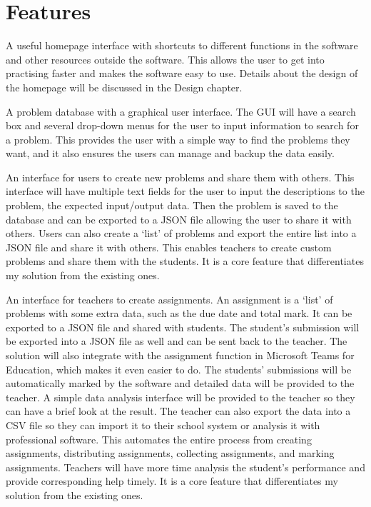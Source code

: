 \documentclass[a4paper]{report}
\begin{document}
\section{Features}

A useful homepage interface with shortcuts to different functions in the software and other resources outside the software. This allows the user to get into practising faster and makes the software easy to use. Details about the design of the homepage will be discussed in the Design chapter.

A problem database with a graphical user interface. The GUI will have a search box and several drop-down menus for the user to input information to search for a problem. This provides the user with a simple way to find the problems they want, and it also ensures the users can manage and backup the data easily.

An interface for users to create new problems and share them with others. This interface will have multiple text fields for the user to input the descriptions to the problem, the expected input/output data. Then the problem is saved to the database and can be exported to a JSON file allowing the user to share it with others. Users can also create a `list' of problems and export the entire list into a JSON file and share it with others. This enables teachers to create custom problems and share them with the students. It is a core feature that differentiates my solution from the existing ones.

An interface for teachers to create assignments. An assignment is a `list' of problems with some extra data, such as the due date and total mark. It can be exported to a JSON file and shared with students. The student's submission will be exported into a JSON file as well and can be sent back to the teacher. The solution will also integrate with the assignment function in Microsoft Teams for Education, which makes it even easier to do. The students' submissions will be automatically marked by the software and detailed data will be provided to the teacher. A simple data analysis interface will be provided to the teacher so they can have a brief look at the result. The teacher can also export the data into a CSV file so they can import it to their school system or analysis it with professional software. This automates the entire process from creating assignments, distributing assignments, collecting assignments, and marking assignments. Teachers will have more time analysis the student's performance and provide corresponding help timely. It is a core feature that differentiates my solution from the existing ones.
\end{document}
